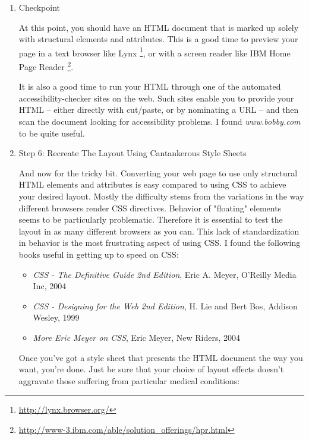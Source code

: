 \documentclass{article}
\begin{document}
\begin{enumerate}
\item Checkpoint
\label{sec:orgheadline285}

At this point, you should have an HTML document that is marked up solely
with structural elements and attributes. This is a good time to preview
your page in a text browser like Lynx \footnote{\url{http://lynx.browser.org/}}, or with a screen reader like
IBM Home Page Reader \footnote{\url{http://www-3.ibm.com/able/solution_offerings/hpr.html}}.

It is also a good time to run your HTML through one of the automated
accessibility-checker sites on the web. Such sites enable you to provide
your HTML -- either directly with cut/paste, or by nominating a URL --
and then scan the document looking for accessibility problems. I found
\emph{www.bobby.com} to be quite useful.

\item Step 6: Recreate The Layout Using Cantankerous Style Sheets
\label{sec:orgheadline286}

And now for the tricky bit. Converting your web page to use only
structural HTML elements and attributes is easy compared to using CSS to
achieve your desired layout. Mostly the difficulty stems from the
variations in the way different browsers render CSS directives. Behavior
of "floating" elements seems to be particularly problematic. Therefore
it is essential to test the layout in as many different browsers as you
can. This lack of standardization in behavior is the most frustrating
aspect of using CSS. I found the following books useful in getting up to
speed on CSS:

\begin{itemize}
\item \emph{CSS - The Definitive Guide 2nd Edition}, Eric A. Meyer, O'Reilly
Media Inc, 2004
\item \emph{CSS - Designing for the Web 2nd Edition}, H. Lie and Bert Bos,
Addison Wesley, 1999
\item \emph{More Eric Meyer on CSS}, Eric Meyer, New Riders, 2004
\end{itemize}

Once you've got a style sheet that presents the HTML document the way
you want, you're done. Just be sure that your choice of layout effects
doesn't aggravate those suffering from particular medical conditions:


\end{enumerate}
\end{document}
